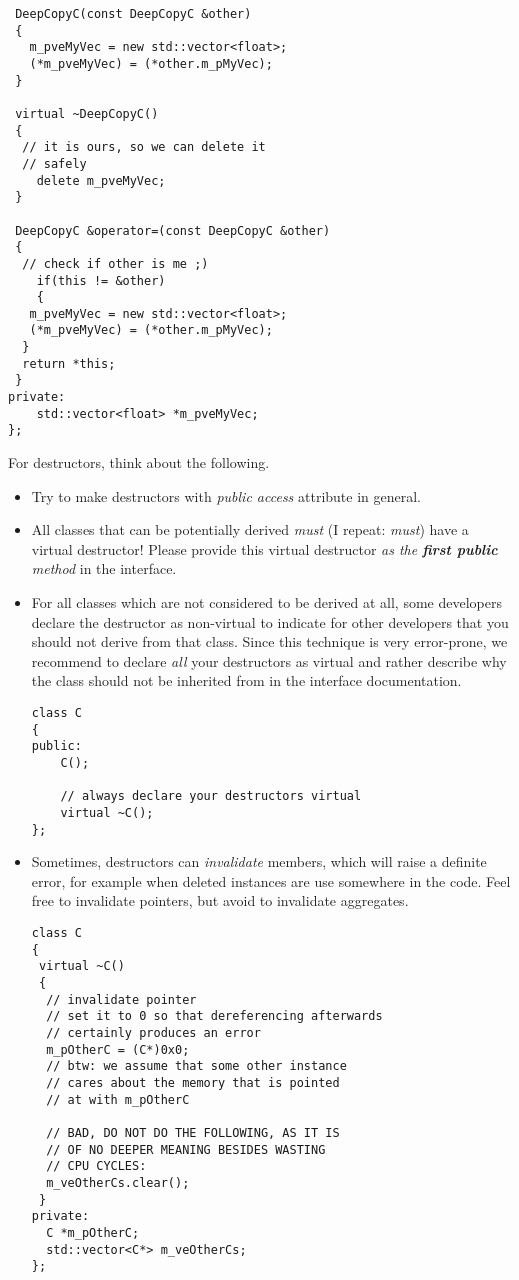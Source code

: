 \begin{itemize}
\begin{verbatim}
 DeepCopyC(const DeepCopyC &other)
 {
   m_pveMyVec = new std::vector<float>;
   (*m_pveMyVec) = (*other.m_pMyVec);
 }
 
 virtual ~DeepCopyC()
 {
  // it is ours, so we can delete it
  // safely
 	delete m_pveMyVec;
 }
 
 DeepCopyC &operator=(const DeepCopyC &other)
 {
  // check if other is me ;)
 	if(this != &other)
 	{
   m_pveMyVec = new std::vector<float>;
   (*m_pveMyVec) = (*other.m_pMyVec);
  }
  return *this;		
 }
private:
	std::vector<float> *m_pveMyVec;
};
\end{verbatim}
\end{itemize}
For destructors, think about the following.
\begin{itemize}
\item Try to make destructors with \emph{public access} attribute in general.
\item All classes that can be potentially derived \emph{must} (I repeat: \emph{must}) have a virtual destructor!
Please provide this virtual destructor \emph{as the \textbf{first public} method} in the interface.
\item For all classes which are not considered to be derived at all, some developers declare the destructor as non-virtual to indicate for other developers that you should not derive from that class.
Since this technique is very error-prone, we recommend to declare \emph{all} your destructors as virtual and rather describe why the class should not be inherited from in the interface documentation.

\begin{verbatim}
class C
{
public:
	C();
	
	// always declare your destructors virtual
	virtual ~C();
};
\end{verbatim}
\item Sometimes, destructors can \emph{invalidate} members, which will raise a definite error, for example when deleted instances are use somewhere in the code.
Feel free to invalidate pointers, but avoid to invalidate aggregates.
\begin{verbatim}
class C
{
 virtual ~C()
 {
  // invalidate pointer
  // set it to 0 so that dereferencing afterwards
  // certainly produces an error
  m_pOtherC = (C*)0x0; 
  // btw: we assume that some other instance
  // cares about the memory that is pointed
  // at with m_pOtherC
  
  // BAD, DO NOT DO THE FOLLOWING, AS IT IS
  // OF NO DEEPER MEANING BESIDES WASTING
  // CPU CYCLES:
  m_veOtherCs.clear();
 }
private:
  C *m_pOtherC;
  std::vector<C*> m_veOtherCs;
};

\end{verbatim}
\end{itemize}

